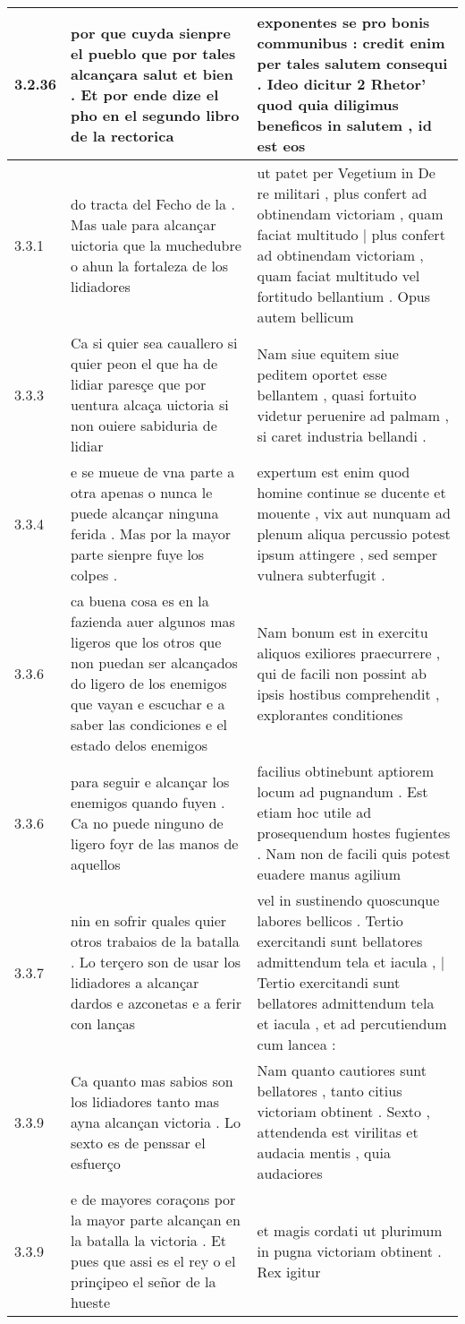 \begin{tabular}{|p{1cm}|p{6.5cm}|p{6.5cm}|}
3.2.36 & por que cuyda sienpre el pueblo que por tales alcançara salut et bien . Et por ende dize el pho en el segundo libro de la rectorica & exponentes se pro bonis communibus : credit enim per tales salutem consequi . Ideo dicitur 2 Rhetor’ quod quia diligimus beneficos in salutem , id est eos \\\hline
3.3.1 & do tracta del Fecho de la . Mas uale para alcançar uictoria que la muchedubre o ahun la fortaleza de los lidiadores & ut patet per Vegetium in De re militari , plus confert ad obtinendam victoriam , quam faciat multitudo | plus confert ad obtinendam victoriam , quam faciat multitudo vel fortitudo bellantium . Opus autem bellicum \\\hline
3.3.3 & Ca si quier sea cauallero si quier peon el que ha de lidiar paresçe que por uentura alcaça uictoria si non ouiere sabiduria de lidiar & Nam siue equitem siue peditem oportet esse bellantem , quasi fortuito videtur peruenire ad palmam , si caret industria bellandi . \\\hline
3.3.4 & e se mueue de vna parte a otra apenas o nunca le puede alcançar ninguna ferida . Mas por la mayor parte sienpre fuye los colpes . & expertum est enim quod homine continue se ducente et mouente , vix aut nunquam ad plenum aliqua percussio potest ipsum attingere , sed semper vulnera subterfugit . \\\hline
3.3.6 & ca buena cosa es en la fazienda auer algunos mas ligeros que los otros que non puedan ser alcançados do ligero de los enemigos que vayan e escuchar e a saber las condiciones e el estado delos enemigos & Nam bonum est in exercitu aliquos exiliores praecurrere , qui de facili non possint ab ipsis hostibus comprehendit , explorantes conditiones \\\hline
3.3.6 & para seguir e alcançar los enemigos quando fuyen . Ca no puede ninguno de ligero foyr de las manos de aquellos & facilius obtinebunt aptiorem locum ad pugnandum . Est etiam hoc utile ad prosequendum hostes fugientes . Nam non de facili quis potest euadere manus agilium \\\hline
3.3.7 & nin en sofrir quales quier otros trabaios de la batalla . Lo terçero son de usar los lidiadores a alcançar dardos e azconetas e a ferir con lanças & vel in sustinendo quoscunque labores bellicos . Tertio exercitandi sunt bellatores admittendum tela et iacula , | Tertio exercitandi sunt bellatores admittendum tela et iacula , et ad percutiendum cum lancea : \\\hline
3.3.9 & Ca quanto mas sabios son los lidiadores tanto mas ayna alcançan victoria . Lo sexto es de penssar el esfuerço & Nam quanto cautiores sunt bellatores , tanto citius victoriam obtinent . Sexto , attendenda est virilitas et audacia mentis , quia audaciores \\\hline
3.3.9 & e de mayores coraçons por la mayor parte alcançan en la batalla la victoria . Et pues que assi es el rey o el prinçipeo el señor de la hueste & et magis cordati ut plurimum in pugna victoriam obtinent . Rex igitur \\\hline

\end{tabular}
